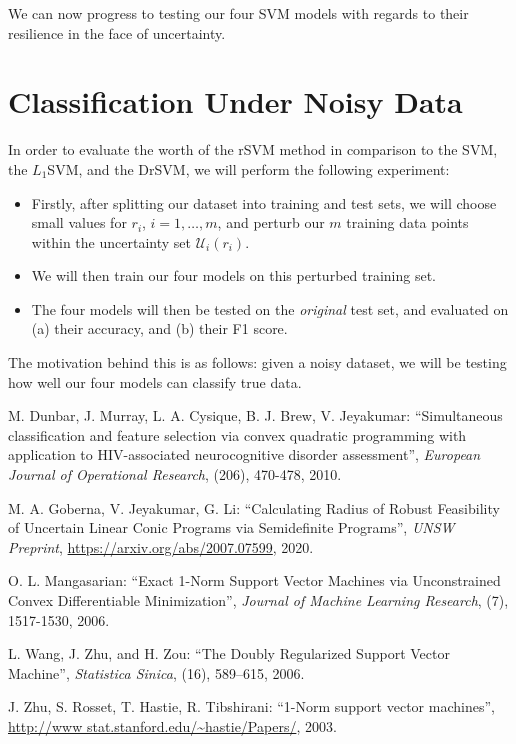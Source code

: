 \documentclass[11pt]{article}
\begin{document}
We can now progress to testing our four SVM models with regards to their resilience in the face of uncertainty. 

\section{Classification Under Noisy Data}
In order to evaluate the worth of the rSVM method in comparison to the SVM, the $L_1$SVM, and the DrSVM, we will perform the following experiment:
\begin{itemize}
	\item Firstly, after splitting our dataset into training and test sets, we will choose small values for $r_i$, $i=1,\dots,m$, and perturb our $m$ training data points within the uncertainty set $\mathcal{U}_i(r_i)$. 
	\item We will then train our four models on this perturbed training set. 
	\item The four models will then be tested on the \emph{original} test set, and evaluated on (a) their accuracy, and (b) their F1 score. 
\end{itemize}
The motivation behind this is as follows: given a noisy dataset, we will be testing how well our four models can classify true data. 

\begin{thebibliography}{99}

 M. Dunbar, J. Murray, L. A. Cysique, B. J. Brew, V. Jeyakumar: ``Simultaneous classification and feature selection via convex quadratic programming with application to HIV-associated neurocognitive disorder assessment'', \emph{European Journal of Operational Research}, (206), 470-478, 2010. 

 M. A. Goberna, V. Jeyakumar, G. Li: ``Calculating Radius of Robust Feasibility of Uncertain Linear Conic Programs via Semidefinite Programs'', \emph{UNSW Preprint}, \url{https://arxiv.org/abs/2007.07599}, 2020.

 O. L. Mangasarian: ``Exact 1-Norm Support Vector Machines via Unconstrained Convex Differentiable Minimization'', \emph{Journal of Machine Learning Research}, (7), 1517-1530, 2006.

 L. Wang, J. Zhu, and H. Zou: ``The Doubly Regularized Support Vector Machine'', \emph{Statistica Sinica}, (16), 589–615, 2006.

 J. Zhu, S. Rosset, T. Hastie, R. Tibshirani: ``1-Norm support vector machines'', \url{http://www stat.stanford.edu/~hastie/Papers/}, 2003. 






\end{thebibliography}
\end{document}
